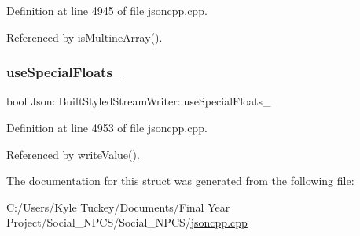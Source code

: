 Definition at line 4945 of file jsoncpp.\+cpp.



Referenced by is\+Multine\+Array().

\mbox{\label{struct_json_1_1_built_styled_stream_writer_a6f1b8694b4eb17ab8c34f6d6dd8c8a4a}} 
\subsubsection{\texorpdfstring{use\+Special\+Floats\+\_\+}{useSpecialFloats\_}}
{\footnotesize\ttfamily bool Json\+::\+Built\+Styled\+Stream\+Writer\+::use\+Special\+Floats\+\_\+\hspace{0.3cm}{\ttfamily [private]}}



Definition at line 4953 of file jsoncpp.\+cpp.



Referenced by write\+Value().



The documentation for this struct was generated from the following file\+:\begin{DoxyCompactItemize}
\item 
C\+:/\+Users/\+Kyle Tuckey/\+Documents/\+Final Year Project/\+Social\+\_\+\+N\+P\+C\+S/\+Social\+\_\+\+N\+P\+C\+S/\hyperlink{jsoncpp_8cpp}{jsoncpp.\+cpp}\end{DoxyCompactItemize}
